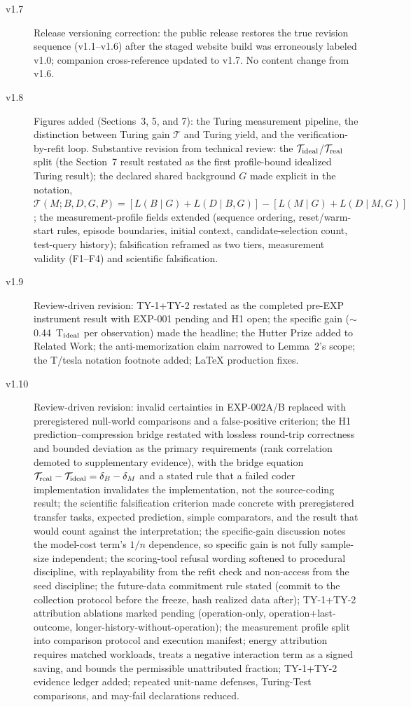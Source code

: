 \documentclass[11pt]{article}
\begin{document}
\begin{description}
\item[v1.7] Release versioning correction: the public release restores the true revision sequence (v1.1--v1.6) after the staged website build was erroneously labeled v1.0; companion cross-reference updated to v1.7. No content change from v1.6.
\item[v1.8] Figures added (Sections~3, 5, and 7): the Turing measurement pipeline, the distinction between Turing gain $\mathcal{T}$ and Turing yield, and the verification-by-refit loop. Substantive revision from technical review: the $\mathcal{T}_{\rm ideal}$/$\mathcal{T}_{\rm real}$ split (the Section~7 result restated as the first profile-bound idealized Turing result); the declared shared background $G$ made explicit in the notation, $\mathcal{T}(M;B,D,G,P)=[L(B\mid G)+L(D\mid B,G)]-[L(M\mid G)+L(D\mid M,G)]$; the measurement-profile fields extended (sequence ordering, reset/warm-start rules, episode boundaries, initial context, candidate-selection count, test-query history); falsification reframed as two tiers, measurement validity (F1--F4) and scientific falsification.
\item[v1.9] Review-driven revision: TY-1+TY-2 restated as the completed pre-EXP instrument result with EXP-001 pending and H1 open; the specific gain ($\sim$0.44~T\(_{\rm ideal}\) per observation) made the headline; the Hutter Prize added to Related Work; the anti-memorization claim narrowed to Lemma~2's scope; the T/tesla notation footnote added; LaTeX production fixes.
\item[v1.10] Review-driven revision: invalid certainties in EXP-002A/B replaced with preregistered null-world comparisons and a false-positive criterion; the H1 prediction--compression bridge restated with lossless round-trip correctness and bounded deviation as the primary requirements (rank correlation demoted to supplementary evidence), with the bridge equation \(\mathcal{T}_{\rm real}-\mathcal{T}_{\rm ideal}=\delta_B-\delta_M\) and a stated rule that a failed coder implementation invalidates the implementation, not the source-coding result; the scientific falsification criterion made concrete with preregistered transfer tasks, expected prediction, simple comparators, and the result that would count against the interpretation; the specific-gain discussion notes the model-cost term's \(1/n\) dependence, so specific gain is not fully sample-size independent; the scoring-tool refusal wording softened to procedural discipline, with replayability from the refit check and non-access from the seed discipline; the future-data commitment rule stated (commit to the collection protocol before the freeze, hash realized data after); TY-1+TY-2 attribution ablations marked pending (operation-only, operation+last-outcome, longer-history-without-operation); the measurement profile split into comparison protocol and execution manifest; energy attribution requires matched workloads, treats a negative interaction term as a signed saving, and bounds the permissible unattributed fraction; TY-1+TY-2 evidence ledger added; repeated unit-name defenses, Turing-Test comparisons, and may-fail declarations reduced.

\end{description}
\end{document}
